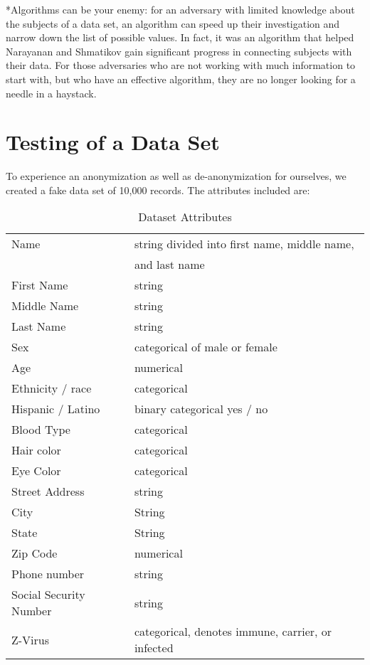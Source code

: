 \documentclass[10pt,journal,compsoc]{IEEEtran}
\begin{document}
	*Algorithms can be your enemy: for an adversary with limited knowledge about the subjects of a data set, an algorithm can speed up their investigation and narrow down the list of possible values. In fact, it was an algorithm that helped Narayanan and Shmatikov gain significant progress in connecting subjects with their data.  For those adversaries who are not working with much information to start with, but who have an effective algorithm, they are no longer looking for a needle in a haystack.\linebreak

\section{Testing of a Data Set}

To experience an anonymization as well as de-anonymization for ourselves, we created a fake data set of 10,000 records.  The attributes included are:

\begin{table} [ht]
\caption{Dataset Attributes}
\begin{tabular}{|l|l|}
\hline
Name & string divided into first name, middle name,\\ & and last name\\
\hline
First Name & string\\
\hline
Middle Name & string\\
\hline
Last Name & string\\
\hline
Sex & categorical of male or female\\
\hline
Age & numerical\\
\hline
Ethnicity / race & categorical\\
\hline
Hispanic / Latino & binary categorical yes / no\\
\hline
Blood Type & categorical\\
\hline
Hair color & categorical\\
\hline
Eye Color & categorical\\
\hline 
Street Address & string\\
\hline
City & String\\
\hline
State & String\\
\hline
Zip Code & numerical\\
\hline
Phone number & string\\
\hline
Social Security Number & string\\
\hline
Z-Virus & categorical, denotes immune, carrier, or infected \\
\hline

\end{tabular}
\end{table}
\end{document}
